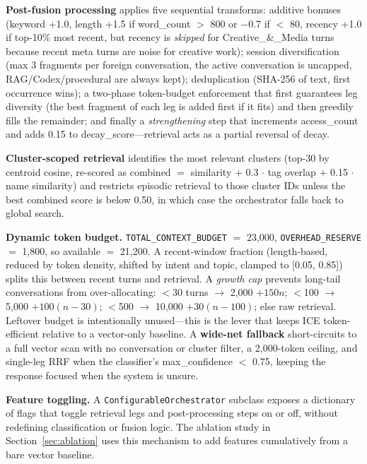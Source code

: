 \documentclass[10pt]{article}
\begin{document}
\textbf{Post-fusion processing} applies five sequential transforms: additive bonuses (keyword +1.0, length +1.5 if word\_count $>$ 800 or $-$0.7 if $<$ 80, recency +1.0 if top-10\% most recent, but recency is \emph{skipped} for Creative\_\&\_Media turns because recent meta turns are noise for creative work); session diversification (max 3 fragments per foreign conversation, the active conversation is uncapped, RAG/Codex/procedural are always kept); deduplication (SHA-256 of text, first occurrence wins); a two-phase token-budget enforcement that first guarantees leg diversity (the best fragment of each leg is added first if it fits) and then greedily fills the remainder; and finally a \emph{strengthening} step that increments access\_count and adds 0.15 to decay\_score---retrieval acts as a partial reversal of decay.

\textbf{Cluster-scoped retrieval} identifies the most relevant clusters (top-30 by centroid cosine, re-scored as combined $=$ similarity $+$ 0.3 $\cdot$ tag overlap $+$ 0.15 $\cdot$ name similarity) and restricts episodic retrieval to those cluster IDs unless the best combined score is below 0.50, in which case the orchestrator falls back to global search.

\textbf{Dynamic token budget.} \texttt{TOTAL\_CONTEXT\_BUDGET} $=$ 23{,}000, \texttt{OVERHEAD\_RESERVE} $=$ 1{,}800, so available $=$ 21{,}200. A recent-window fraction (length-based, reduced by token density, shifted by intent and topic, clamped to [0.05, 0.85]) splits this between recent turns and retrieval. A \emph{growth cap} prevents long-tail conversations from over-allocating: $<$30 turns $\to$ 2{,}000 $+ 150n$; $<$100 $\to$ 5{,}000 $+ 100(n-30)$; $<$500 $\to$ 10{,}000 $+ 30(n-100)$; else raw retrieval. Leftover budget is intentionally unused---this is the lever that keeps ICE token-efficient relative to a vector-only baseline. A \textbf{wide-net fallback} short-circuits to a full vector scan with no conversation or cluster filter, a 2{,}000-token ceiling, and single-leg RRF when the classifier's max\_confidence $<$ 0.75, keeping the response focused when the system is unsure.

\textbf{Feature toggling.} A \texttt{ConfigurableOrchestrator} subclass exposes a dictionary of flags that toggle retrieval legs and post-processing steps on or off, without redefining classification or fusion logic. The ablation study in Section~\ref{sec:ablation} uses this mechanism to add features cumulatively from a bare vector baseline.
\end{document}
